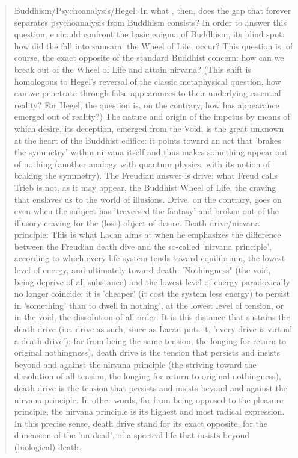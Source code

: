 \documentclass{book}
\begin{document}
\begin{quotation}
Buddhism/Psychoanalysis/Hegel: In what , then, does the gap that forever separates psychoanalysis from Buddhism consists? In order to answer this question, e should confront the basic enigma of Buddhism, its blind spot: how did the fall into samsara, the Wheel of Life, occur? This question is, of course, the exact opposite of the standard Buddhist concern: how can we break out of the Wheel of Life and attain nirvana? (This shift is homologous to Hegel's reversal of the classic metaphysical question, how can we penetrate through false appearances to their underlying essential reality? For Hegel, the question is, on the contrary, how has appearance emerged out of reality?) The nature and origin of the impetus by means of which desire, its deception, emerged from the Void, is the great unknown at the heart of the Buddhist edifice: it points toward an act that 'brakes the symmetry' within nirvana itself and thus makes something appear out of nothing (another analogy with quantum physics, with its notion of braking the symmetry). The Freudian answer is drive: what Freud calls Trieb is not, as it may appear, the Buddhist Wheel of Life, the craving that enslaves us to the world of illusions. Drive, on the contrary, goes on even when the subject has 'traversed the fantasy' and broken out of the illusory craving for the (lost) object of desire.
Death drive/nirvana principle: This is what Lacan aims at when he emphasizes the difference between the Freudian death dive and the so-called 'nirvana principle', according to which every life system tends toward equilibrium, the lowest level of energy, and ultimately toward death. 'Nothingness" (the void, being deprive of all substance) and the lowest level of energy paradoxically no longer coincide; it is 'cheaper' (it cost the system less energy) to persist in 'something' than to dwell in nothing', at the lowest level of tension, or in the void, the dissolution of all order. It is this distance that sustains the death drive (i.e. drive as such, since as Lacan puts it, 'every drive is virtual a death drive'): far from being the same tension, the longing for return to original nothingness), death drive is the tension that persists and insists beyond and against the nirvana principle (the striving toward the  dissolution of all tension, the longing for return to original nothingness), death drive is the tension that persists and insists beyond and against the nirvana principle. In other words, far from being opposed to the pleasure principle, the nirvana principle is its highest and most radical expression. In this precise sense, death drive stand for its exact opposite, for the dimension of the 'un-dead', of a spectral life that insists beyond (biological) death.
\end{quotation}
\end{document}
